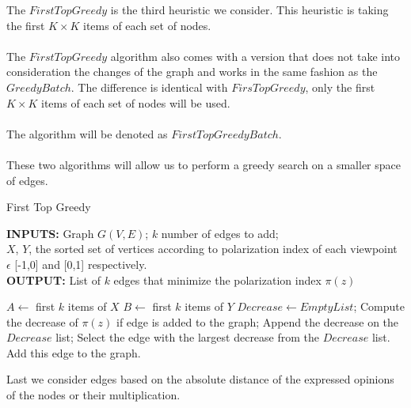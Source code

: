 \vspace{10pt}
\clearpage

\noindent The $FirstTopGreedy$ is the third heuristic we consider. This heuristic is taking the first $K \times K$ items of each set of nodes.
\\
\\
The $FirstTopGreedy$ algorithm also comes with a version that does not take into consideration the changes of the graph and works in the same fashion as the $GreedyBatch$. The difference is identical with  $FirsTopGreedy$, only the first $K \times K$ items of each set of nodes will be used. 
\\
\\
The algorithm will be denoted as $FirstTopGreedyBatch$.
\\
\\
These two algorithms will allow us to perform a greedy search on a smaller space of edges. 
\\
\begin{algorithm}[htbp]
	\caption{First Top Greedy}
	\label{alg:kgreedy}
	
	\begin{flushleft}
        		\textbf{INPUTS:} Graph $G(V, E)$; $k$ number of edges to add;\\
		$X$, $Y $, the sorted set of vertices according to polarization index of each viewpoint $\epsilon$ [-1,0] and [0,1] respectively.\\
		\vspace{6pt}
        		\textbf{OUTPUT:} List of $k$ edges that minimize the polarization index $\pi(z)$
	\end{flushleft}
	
	\begin{algorithmic}[1]
		\STATE $A \leftarrow $ first $k$ items of $X$
		\STATE $B \leftarrow $ first $k$ items of $Y$
			\STATE$Decrease \leftarrow Empty List$;
				\STATE Compute the decrease of $\pi(z)$ if edge is added to the graph;
				\STATE Append the decrease on the $Decrease$ list;
			\ENDFOR
			\STATE Select the edge with the largest decrease from the $Decrease$ list.
			\STATE Add this edge to the graph.
		\ENDFOR
	\end{algorithmic}
	
\end{algorithm}
		
\clearpage

\noindent Last we consider edges based on the absolute distance of the expressed opinions of the nodes or their multiplication.

